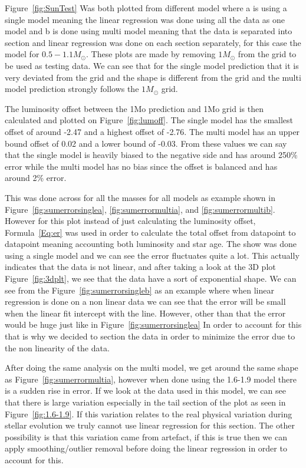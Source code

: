 Figure~\ref{fig:SunTest} Was both plotted from different model where a is using a single model meaning the linear regression was done using all the data as one model and b is done using multi model meaning that the data is separated into section and linear regression was done on each section separately, for this case the model for $0.5-1.1 M_\odot$. These plots are made by removing $1M_\odot$ from the grid to be used as testing data. We can see that for the single model prediction that it is very deviated from the grid and the shape is different from the grid and the multi model prediction strongly follows the $1M_\odot$ grid.

The luminosity offset between the 1Mo prediction and 1Mo grid is then calculated and plotted on Figure~\ref{fig:lumoff}. The single model has the smallest offset of around -2.47 and a highest offset of -2.76. The multi model has an upper bound offset of 0.02 and a lower bound of -0.03. From these values we can say that the single model is heavily biased to the negative side and has around 250\% error while the multi model has no bias since the offset is balanced and has around 2\% error. 

This was done across for all the masses for all models as example shown in Figure~\ref{fig:sumerrorsinglea}, \ref{fig:sumerrormultia}, and \ref{fig:sumerrormultib}. However for this plot instead of just calculating the luminosity offset, Formula~\ref{Eq:er} was used in order to calculate the total offset from datapoint to datapoint meaning accounting both luminosity and star age. The show was done using a single model and we can see the error fluctuates quite a lot. This actually indicates that the data is not linear, and after taking a look at the 3D plot Figure~\ref{fig:3dplt}, we see that the data have a sort of exponential shape. We can see from the Figure~\ref{fig:sumerrorsingleb} as an example where when linear regression is done on a non linear data we can see that the error will be small when the linear fit intercept with the line. However, other than that the error would be huge just like in Figure~\ref{fig:sumerrorsinglea} In order to account for this that is why we decided to section the data in order to minimize the error due to the non linearity of the data.

After doing the same analysis on the multi model, we get around the same shape as Figure~\ref{fig:sumerrormultia}, however when done using the 1.6-1.9 model there is a sudden rise in error. If we look at the data used in this model, we can see that there is large variation especially in the tail section of the plot as seen in Figure~\ref{fig:1.6-1.9}. If this variation relates to the real physical variation during stellar evolution we truly cannot use linear regression for this section. The other possibility is that this variation came from artefact, if this is true then we can apply smoothing/outlier removal before doing the linear regression in order to account for this.

